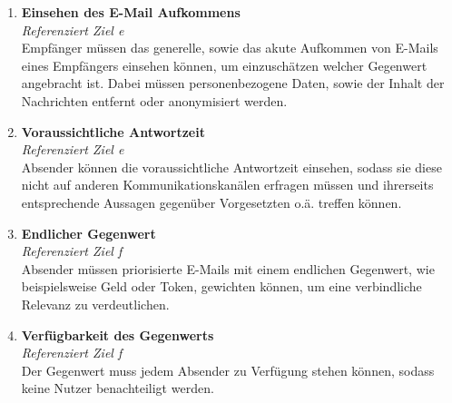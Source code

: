 \begin{enumerate}[label=(\alph*)]
    \item \textbf{Einsehen des E-Mail Aufkommens}\\
    \textit{Referenziert Ziel e} \\
        Empfänger müssen das generelle, sowie das akute Aufkommen von E-Mails eines Empfängers einsehen können, um einzuschätzen welcher Gegenwert angebracht ist. Dabei müssen personenbezogene Daten, sowie der Inhalt der Nachrichten entfernt oder anonymisiert werden. 
    
    \newpage
        
    \item \textbf{Voraussichtliche Antwortzeit}\\
    \textit{Referenziert Ziel e} \\
        Absender können die voraussichtliche Antwortzeit einsehen, sodass sie diese nicht auf anderen Kommunikationskanälen erfragen müssen und ihrerseits entsprechende Aussagen gegenüber Vorgesetzten o.ä. treffen können. 
        
    \item \textbf{Endlicher Gegenwert}\\
    \textit{Referenziert Ziel f} \\
        Absender müssen priorisierte E-Mails mit einem endlichen Gegenwert, wie beispielsweise Geld oder Token, gewichten können, um eine verbindliche Relevanz zu verdeutlichen.
        
    \item \textbf{Verfügbarkeit des Gegenwerts}\\
    \textit{Referenziert Ziel f} \\
        Der Gegenwert muss jedem Absender zu Verfügung stehen können, sodass keine Nutzer benachteiligt werden.
\end{enumerate}